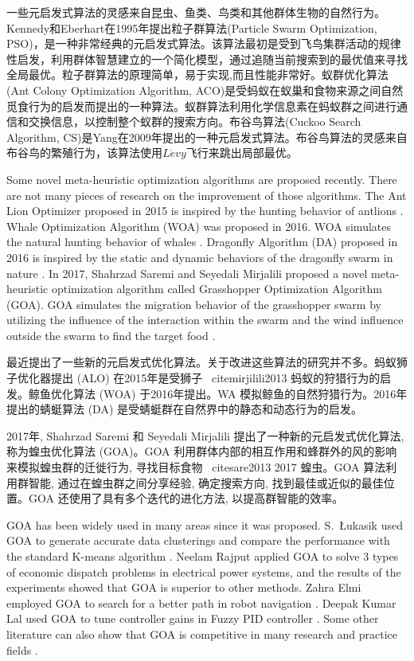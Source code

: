 一些元启发式算法的灵感来自昆虫、鱼类、鸟类和其他群体生物的自然行为。Kennedy和Eberhart在1995年提出粒子群算法(Particle Swarm Optimization, PSO)，是一种非常经典的元启发式算法\cite{kennedy1995particle,liao2007discrete,krishnasamy2013task}。该算法最初是受到飞鸟集群活动的规律性启发，利用群体智慧建立的一个简化模型，通过追随当前搜索到的最优值来寻找全局最优。粒子群算法的原理简单，易于实现,而且性能非常好。蚁群优化算法(Ant Colony Optimization Algorithm, ACO)是受蚂蚁在蚁巢和食物来源之间自然觅食行为的启发而提出的一种算法\cite{dorigo1997ant,dorigo1999ant,郝航2018基于并行化蚁群算法的网络测量节点选取算法}。蚁群算法利用化学信息素在蚂蚁群之间进行通信和交换信息，以控制整个蚁群的搜索方向。布谷鸟算法(Cuckoo Search Algorithm, CS)是Yang在2009年提出的一种元启发式算法\cite{yang2009cuckoo}。布谷鸟算法的灵感来自布谷鸟的繁殖行为，该算法使用$L\acute{e}vy$飞行来跳出局部最优。

Some novel meta-heuristic optimization algorithms are proposed recently. There are not many pieces of research on the improvement of those algorithms. The Ant Lion Optimizer proposed in 2015 is inspired by the hunting behavior of antlions \cite{mirjalili2015ant}. Whale Optimization Algorithm (WOA) was proposed in 2016. WOA simulates the natural hunting behavior of whales \cite{mirjalili2016WOA}. Dragonfly Algorithm (DA) proposed in 2016 is inspired by the static and dynamic behaviors of the dragonfly swarm in nature \cite{mirjalili2016dragonfly}. In 2017, Shahrzad Saremi and Seyedali Mirjalili proposed a novel meta-heuristic optimization algorithm called Grasshopper Optimization Algorithm (GOA). GOA simulates the migration behavior of the grasshopper swarm by utilizing the influence of the interaction within the swarm and the wind influence outside the swarm to find the target food \cite{saremi2017grasshopper}. 

最近提出了一些新的元启发式优化算法。关于改进这些算法的研究并不多。蚂蚁狮子优化器提出 (ALO) 在2015年是受狮子 \ citemirjilili2013 蚂蚁的狩猎行为的启发。鲸鱼优化算法 (WOA) 于2016年提出。WA 模拟鲸鱼的自然狩猎行为。2016年提出的蜻蜓算法 (DA) 是受蜻蜓群在自然界中的静态和动态行为的启发。


2017年, Shahrzad Saremi 和 Seyedali Mirjalili 提出了一种新的元启发式优化算法, 称为蝗虫优化算法 (GOA)。GOA 利用群体内部的相互作用和蜂群外的风的影响来模拟蝗虫群的迁徙行为, 寻找目标食物 \ citesare2013 2017 蝗虫。GOA 算法利用群智能, 通过在蝗虫群之间分享经验, 确定搜索方向, 找到最佳或近似的最佳位置。GOA 还使用了具有多个迭代的进化方法, 以提高群智能的效率。

GOA has been widely used in many areas since it was proposed. S.~Łukasik used GOA to generate accurate data clusterings and compare the performance with the standard K-means algorithm \cite{Łukasik}. Neelam Rajput applied GOA to solve 3 types of economic dispatch problems in electrical power systems, and the results of the experiments showed that GOA is superior to other methods\cite{rajput}. Zahra Elmi employed GOA to search for a better path in robot navigation \cite{elmi}. Deepak Kumar Lal used GOA to tune controller gains in Fuzzy PID controller \cite{lal}. Some other literature can also show that GOA is competitive in many research and practice fields \cite{hamour,hekimoglu,ahanch,amaireh,barik}. 

